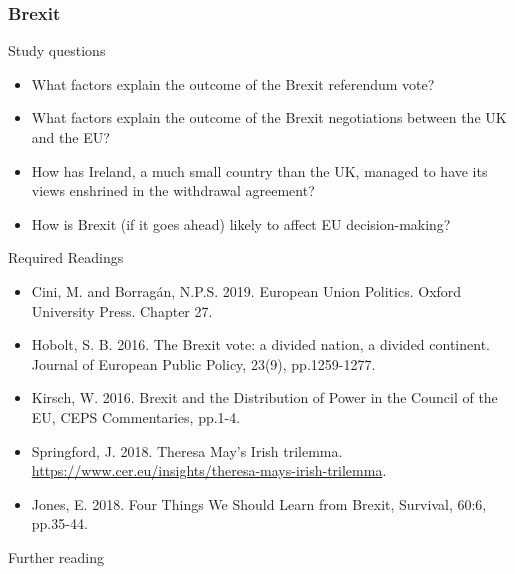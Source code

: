 \subsubsection*{Brexit}

Study questions

\begin{itemize}
	\item What factors explain the outcome of the Brexit referendum vote?
	\item What factors explain the outcome of the Brexit negotiations between the UK and the EU?
	\item How has Ireland, a much small country than the UK, managed to have its views enshrined in the withdrawal agreement?
	\item How is Brexit (if it goes ahead) likely to affect EU decision-making?
\end{itemize}

\noindent Required Readings

\begin{itemize}
	\item Cini, M. and Borragán, N.P.S. 2019. European Union Politics. Oxford University Press. Chapter 27.
	\item Hobolt, S. B. 2016. The Brexit vote: a divided nation, a divided continent. Journal of European Public Policy, 23(9), pp.1259-1277.
	\item Kirsch, W. 2016. Brexit and the Distribution of Power in the Council of the EU, CEPS Commentaries, pp.1-4. 
	\item Springford, J. 2018. Theresa May's Irish trilemma. \url{https://www.cer.eu/insights/theresa-mays-irish-trilemma}.
	\item Jones, E. 2018. Four Things We Should Learn from Brexit, Survival, 60:6, pp.35-44.
\end{itemize}

\noindent Further reading

